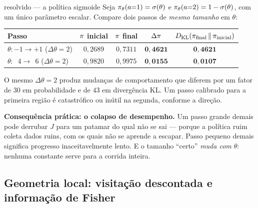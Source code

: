 \documentclass[11pt, a4paper]{article}
\newcommand{\KLd}[2]{D_{\mathrm{KL}}\!\left(#1\,\|\,#2\right)}
\begin{document}
\begin{exbox}{resolvido — a política sigmoide}
Seja $\pi_\theta(a{=}1) = \sigma(\theta)$ e $\pi_\theta(a{=}2) = 1-\sigma(\theta)$,
com um único parâmetro escalar. Compare dois passos de \emph{mesmo tamanho} em
$\theta$:

\medskip
\begin{center}
\begin{tabular}{@{}lcccc@{}}
\toprule
Passo & $\pi$ inicial & $\pi$ final & $\Delta\pi$ & $\KLd{\pol_{\text{final}}}{\pol_{\text{inicial}}}$ \\
\midrule
$\theta: -1 \to +1$ \; ($\Delta\theta = 2$) & $0{,}2689$ & $0{,}7311$ & $\mathbf{0{,}4621}$ & $\mathbf{0{,}4621}$ \\
$\theta: \;\;4 \to \;\,6$ \; ($\Delta\theta = 2$) & $0{,}9820$ & $0{,}9975$ & $\mathbf{0{,}0155}$ & $\mathbf{0{,}0107}$ \\
\bottomrule
\end{tabular}
\end{center}
\vspace{-0.3em}
O mesmo $\Delta\theta = 2$ produz mudanças de comportamento que diferem por um
fator de $30$ em probabilidade e de $43$ em divergência KL. Um passo calibrado
para a primeira região é catastrófico ou inútil na segunda, conforme a direção.
\end{exbox}

\begin{alertabox}
\textbf{Consequência prática: o colapso de desempenho.} Um passo grande demais
pode derrubar $J$ para um patamar do qual não se sai --- porque a política ruim
coleta dados ruins, com os quais não se aprende a escapar. Passo pequeno demais
significa progresso inaceitavelmente lento. E o tamanho ``certo'' \emph{muda com
$\theta$}: nenhuma constante serve para a corrida inteira.
\end{alertabox}

\subsection{Geometria local: visitação descontada e informação de Fisher}
\end{document}
